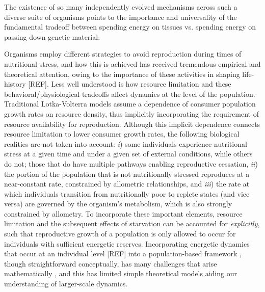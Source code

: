 \documentclass[12pt,english]{article}
\begin{document}
\begin{spacing}{1.9}
The existence of so many independently evolved mechanisms across such a diverse suite of organisms points to the importance and universality of the fundamental tradeoff between spending energy on tissues vs. spending energy on passing down genetic material.

Organisms employ different strategies to avoid reproduction during times of nutritional stress, and how this is achieved has received tremendous empirical and theoretical attention, owing to the importance of these activities in shaping life-history [REF].
Less well understood is how resource limitation and these behavioral/physiological tradeoffs affect dynamics at the level of the population.
Traditional Lotka-Volterra models assume a dependence of consumer population growth rates on resource density, thus implicitly incorporating the requirement of resource availability for reproduction.
Although this implicit dependence connects resource limitation to lower consumer growth rates, the following biological realities are not taken into account:
\emph{i}) some individuals experience nutritional stress at a given time and under a given set of external conditions, while others do not; those that do have multiple pathways enabling reproductive cessation, 
\emph{ii}) the portion of the population that is not nutritionally stressed reproduces at a near-constant rate, constrained by allometric relationships, and
\emph{iii}) the rate at which individuals transition from nutritionally poor to replete states (and vice versa) are governed by the organism's metabolism, which is also strongly constrained by allometry.
To incorporate these important elements, resource limitation and the subsequent effects of starvation can be accounted for \emph{explicitly}, such that reproductive growth of a population is only allowed to occur for individuals with sufficient energetic reserves.
Incorporating energetic dynamics that occur at an individual level [REF] into a population-based framework \citep{Kooi2000,Sousa:2010ez}, though straightforward conceptually, has many challenges that arise mathematically \citep{Diekmann:2010da}, and this has limited simple theoretical models aiding our understanding of larger-scale dynamics.


\end{spacing}
\end{document}
